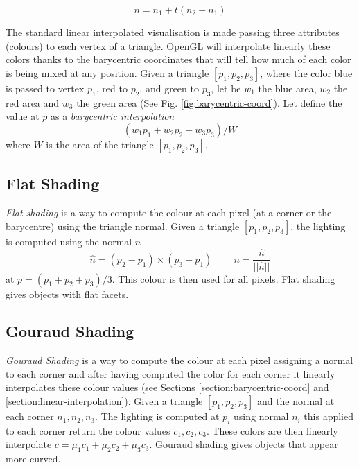 $$ n = n_1 + t (n_2 - n_1)$$


The standard linear interpolated visualisation is made passing three attributes (colours) to each vertex of a triangle. OpenGL will interpolate linearly these colors thanks to the barycentric coordinates that will tell how much of each color is being mixed at any position.
Given a triangle $[p_1, p_2, p_3]$, where the color blue is passed to vertex $p_1$, red to $p_2$, and green to $p_3$, let be $w_1$ the blue area, $w_2$ the red area and $w_3$ the green area (See Fig. \ref{fig:barycentric-coord}). Let define the value at $p$ as a \textit{barycentric interpolation} $$(w_1p_1 + w_2p_2 + w_3p_3)/W$$ where $W$ is the area of the triangle $[p_1, p_2, p_3]$.


\subsection{Flat Shading}
\textit{Flat shading} is a way to compute the colour at each pixel (at a corner or the barycentre) using the triangle normal.
Given a triangle $[p_1, p_2, p_3]$, the lighting is computed using the normal $n$ $$\widehat{n} = (p_2 - p_1) \times (p_3 - p_1) \;\;\;\;\;\;\;\; n = \frac{ \widehat{n} } { ||\widehat{n}|| } $$ at $p= (p_1 + p_2 + p_3)/3$. This colour is then used for all pixels. Flat shading gives objects with flat facets.
\cite{SLIDE:ICORSI}

\subsection{Gouraud Shading}
\textit{Gouraud Shading} is a way to compute the colour at each pixel assigning a normal to each corner and after having computed the color for each corner it linearly interpolates these colour values (see Sections \ref{section:barycentric-coord} and \ref{section:linear-interpolation}).
Given a triangle $[p_1, p_2, p_3]$ and the normal at each corner $n_1, n_2, n_3$.
The lighting is computed at $p_i$ using normal $n_i$ this applied to each corner return the colour values $c_1, c_2, c_3$.
These colors are then linearly interpolate $c = {\mu}_1 c_1 + {\mu}_2 c_2 + {\mu}_3 c_3$. Gouraud shading gives objects that appear more curved. \cite{SLIDE:ICORSI}



